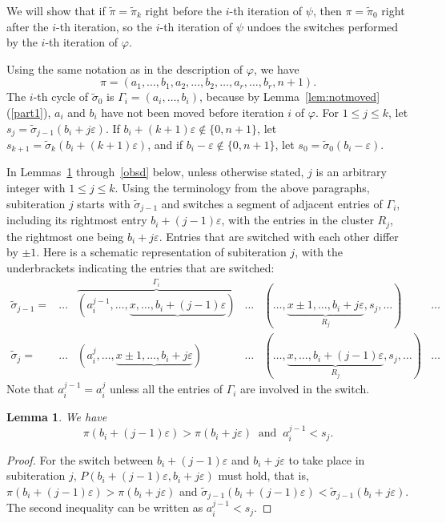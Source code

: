 \documentclass[11pt]{amsart}
\newtheorem{lemma}[theorem]{Lemma}
\newcommand\wt{\widetilde}
\newcommand\bij{\varphi}
\newcommand\inv{\psi}
\newcommand\eps{\varepsilon}
\newcommand\sigm{\wt\sigma}
\newcommand\pim{\wt\pi}
\begin{document}
We will show that if $\pim=\pim_k$ right before the $i$-th iteration of $\inv$, then $\pi=\pim_0$ right after the $i$-th iteration,
so the $i$-th iteration of $\inv$ undoes the switches performed by the $i$-th iteration of $\bij$.

Using the same notation as in the description of $\bij$, we have $$\pi=(a_1,\dots,b_1,a_2,\dots,b_2,\dots,a_r,\dots,b_r,n+1).$$
The $i$-th cycle of $\sigm_0$ is $\Gamma_i=(a_i,\dots,b_i)$, because by Lemma~\ref{lem:notmoved}(\ref{part1}), $a_i$ and $b_i$ have not been moved before iteration $i$ of $\bij$.
For $1\le j\le k$, let $s_j=\sigm_{j-1}(b_i+j\eps)$. If $b_i+(k{+}1)\eps\notin\{0,n+1\}$, let $s_{k+1}=\sigm_k(b_i+(k{+}1)\eps)$, and if $b_i-\eps\notin\{0,n+1\}$, let $s_0=\sigm_0(b_i-\eps)$.

In Lemmas~\ref{obsa} through~\ref{obsd} below, unless otherwise stated, $j$ is an arbitrary integer with $1\le j\le k$.
Using the terminology from the above paragraphs,
subiteration $j$
starts with $\sigm_{j-1}$ and
switches a segment of adjacent entries of $\Gamma_i$, including its rightmost entry $b_i+(j{-}1)\eps$,
with the entries in the cluster $R_j$, the rightmost one being $b_i+j\eps$. Entries that are switched with each other differ by $\pm1$. Here is a schematic representation of subiteration $j$, with the underbrackets
indicating the entries that are switched:
$$\begin{array}{rccccc} \sigm_{j-1}=& \dots &\overbrace{(a_i^{j-1},\dots,\underbrace{x,\dots, b_i+(j{-}1)\eps})}^{\Gamma_i}& \dots &(\dots,\underbrace{x{\pm}1,\dots, b_i+j\eps}_{R_j}, s_j, \dots)& \dots \\
\sigm_{j}=& \dots &(a_i^{j},\dots,\underbrace{x{\pm}1,\dots, b_i+j\eps})& \dots  &(\dots,\underbrace{x,\dots, b_i+(j{-}1)\eps}_{R_j}, s_j, \dots)& \dots
\end{array}$$
Note that $a_i^{j-1}=a_i^j$ unless all the entries of $\Gamma_i$ are involved in the switch.

\begin{lemma}\label{obsa}
We have
$$\pi(b_i+(j{-}1)\eps)>\pi(b_i+j\eps)\ \textrm{ and }\ a_i^{j-1}<s_j.$$
\end{lemma}

\begin{proof}
For the switch between $b_i+(j{-}1)\eps$ and $b_i+j\eps$ to take place in subiteration $j$, $P(b_i+(j{-}1)\eps,b_i+j\eps)$ must hold, that is,
$\pi(b_i+(j{-}1)\eps)>\pi(b_i+j\eps)$ and $\sigm_{j-1}(b_i+(j{-}1)\eps)<\sigm_{j-1}(b_i+j\eps)$. The second inequality can be written as $a_i^{j-1}<s_j$.
\end{proof}
\end{document}
